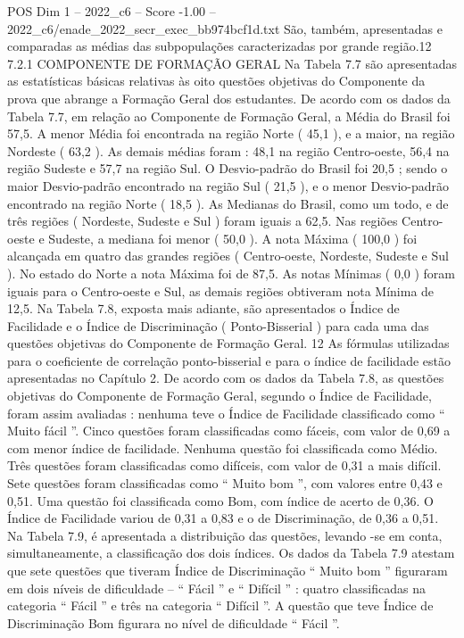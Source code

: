 \begin{textsample}{POS Dim 1 – 2022\_c6 – Score -1.00 – 2022\_c6/enade\_2022\_secr\_exec\_bb974bcf1d.txt}
São, também, apresentadas e comparadas as médias das subpopulações caracterizadas por grande região.12 7.2.1 COMPONENTE DE FORMAÇÃO GERAL Na Tabela 7.7 são apresentadas as estatísticas básicas relativas às oito questões objetivas do Componente da prova que abrange a Formação Geral dos estudantes.
De acordo com os dados da Tabela 7.7, em relação ao Componente de Formação Geral, a Média do Brasil foi 57,5.
A menor Média foi encontrada na região Norte ( 45,1 ), e a maior, na região Nordeste ( 63,2 ).
As demais médias foram : 48,1 na região Centro-oeste, 56,4 na região Sudeste e 57,7 na região Sul.
O Desvio-padrão do Brasil foi 20,5 ; sendo o maior Desvio-padrão encontrado na região Sul ( 21,5 ), e o menor Desvio-padrão encontrado na região Norte ( 18,5 ).
As Medianas do Brasil, como um todo, e de três regiões ( Nordeste, Sudeste e Sul ) foram iguais a 62,5.
Nas regiões Centro-oeste e Sudeste, a mediana foi menor ( 50,0 ).
A nota Máxima ( 100,0 ) foi alcançada em quatro das grandes regiões ( Centro-oeste, Nordeste, Sudeste e Sul ).
No estado do Norte a nota Máxima foi de 87,5.
As notas Mínimas ( 0,0 ) foram iguais para o Centro-oeste e Sul, as demais regiões obtiveram nota Mínima de 12,5.
Na Tabela 7.8, exposta mais adiante, são apresentados o Índice de Facilidade e o Índice de Discriminação ( Ponto-Bisserial ) para cada uma das questões objetivas do Componente de Formação Geral. 12 As fórmulas utilizadas para o coeficiente de correlação ponto-bisserial e para o índice de facilidade estão apresentadas no Capítulo 2.
De acordo com os dados da Tabela 7.8, as questões objetivas do Componente de Formação Geral, segundo o Índice de Facilidade, foram assim avaliadas : nenhuma teve o Índice de Facilidade classificado como “ Muito fácil ”.
Cinco questões foram classificadas como fáceis, com valor de 0,69 a com menor índice de facilidade.
Nenhuma questão foi classificada como Médio.
Três questões foram classificadas como difíceis, com valor de 0,31 a mais difícil.
Sete questões foram classificadas como “ Muito bom ”, com valores entre 0,43 e 0,51.
Uma questão foi classificada como Bom, com índice de acerto de 0,36.
O Índice de Facilidade variou de 0,31 a 0,83 e o de Discriminação, de 0,36 a 0,51.
Na Tabela 7.9, é apresentada a distribuição das questões, levando -se em conta, simultaneamente, a classificação dos dois índices.
Os dados da Tabela 7.9 atestam que sete questões que tiveram Índice de Discriminação “ Muito bom ” figuraram em dois níveis de dificuldade – “ Fácil ” e “ Difícil ” : quatro classificadas na categoria “ Fácil ” e três na categoria “ Difícil ”.
A questão que teve Índice de Discriminação Bom figurara no nível de dificuldade “ Fácil ”.

\end{textsample}

